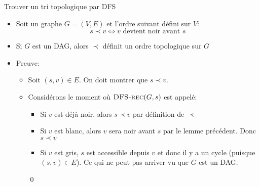 \begin{frame}{Trouver un tri topologique par DFS}
\begin{itemize}
\item Soit un graphe $G=(V,E)$ et l'ordre suivant défini sur $V$:
$$s\prec v\Leftrightarrow v\mbox{ devient noir avant }s$$
\item Si $G$ est un DAG, alors $\prec$ définit un ordre topologique sur $G$

\bigskip

\item \alert{Preuve:}
\begin{itemize}
\item Soit $(s,v)\in E$. On doit montrer que $s\prec v$.
\item Considérons le moment où $\textnormal{\scshape DFS-rec}(G,s)$ est appelé:
\begin{itemize}
\item Si $v$ est déjà noir, alors $s\prec v$ par définition de $\prec$
\item Si $v$ est blanc, alors $v$ sera noir avant $s$ par le lemme
  précédent. Donc $s\prec v$
\item Si $v$ est gris, $s$ est accessible depuis $v$ et donc il y a un
  cycle (puisque $(s,v)\in E$). Ce qui ne peut pas arriver vu que $G$ est un DAG.
\end{itemize}\qed
\end{itemize}
\end{itemize}
\end{frame}

